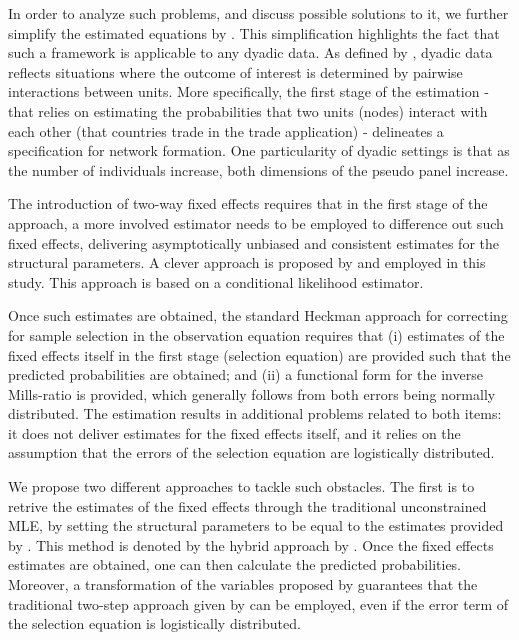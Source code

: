 In order to analyze such problems, and discuss possible solutions to it, we further simplify the estimated equations by \cite{helpman2008estimating}. This simplification highlights the fact that such a framework is applicable to any dyadic data. As defined by \cite{graham2020dyadic}, dyadic data reflects situations where the outcome of interest is determined by pairwise interactions between units. More specifically, the first stage of the estimation - that relies on estimating the probabilities that two units (nodes) interact with each other (that countries trade in the trade application) - delineates a specification for network formation. One particularity of dyadic settings is that as the number of individuals increase, both dimensions of the pseudo panel increase.

The introduction of two-way fixed effects requires that in the first stage of the approach, a more involved estimator needs to be employed to difference out such fixed effects, delivering asymptotically unbiased and consistent estimates for the structural parameters. A clever approach is proposed by \cite{charbonneau2017multiple} and employed in this study. This approach is based on a conditional likelihood estimator.

Once such estimates are obtained, the standard Heckman approach for correcting for sample selection in the observation equation requires that (i) estimates of the fixed effects itself in the first stage (selection equation) are provided such that the predicted probabilities are obtained; and (ii) a functional form for the inverse Mills-ratio is provided, which generally follows from both errors being normally distributed. The \cite{charbonneau2017multiple} estimation results in additional problems related to both items: it does not deliver estimates for the fixed effects itself, and it relies on the assumption that the errors of the selection equation are logistically distributed.

We propose two different approaches to tackle such obstacles. The first is to retrive the estimates of the fixed effects through the traditional unconstrained MLE, by setting the structural parameters to be equal to the estimates provided by \cite{charbonneau2017multiple}. This method is denoted by the hybrid approach by \cite{martin2018bls}. Once the fixed effects estimates are obtained, one can then calculate the predicted probabilities. Moreover, a transformation of the variables proposed by \cite{lee1983generalized} guarantees that the traditional two-step approach given by \cite{heckman1979sample} can be employed, even if the error term of the selection equation is logistically distributed.

